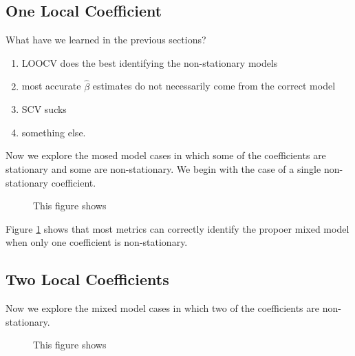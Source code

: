 \documentclass{article}\usepackage[]{graphicx}\usepackage[]{color}
\begin{document}
\subsection{One Local Coefficient}

What have we learned in the previous sections?
\begin{enumerate}
\item LOOCV does the best identifying the non-stationary models
\item most accurate $\hat{\beta}$ estimates do not necessarily come from the correct model
\item SCV sucks
\item something else.
\end{enumerate}

Now we explore the mosed model cases in which some of the coefficients are stationary and some are non-stationary. We begin with the case of a single non-stationary coefficient. 




\begin{figure}
\caption{This figure shows }
\label{fig:modelIdentificationOneL}
\end{figure}

Figure \ref{fig:modelIdentificationOneL} shows that most metrics can correctly identify the propoer mixed model when only one coefficient is non-stationary.

\subsection{Two Local Coefficients}


Now we explore the mixed model cases in which two of the coefficients are non-stationary. 




\begin{figure}
\caption{This figure shows }
\label{fig:modelIdentificationOneG}
\end{figure}
\end{document}
